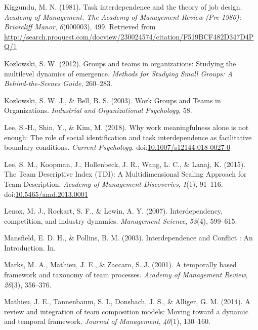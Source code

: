 \documentclass[english,,man]{apa6}
\theoremstyle{definition}
\theoremstyle{definition}
\theoremstyle{definition}
\theoremstyle{remark}
\begin{document}
\leavevmode\hypertarget{ref-kiggundu_task_1981}{}%
Kiggundu, M. N. (1981). Task interdependence and the theory of job
design. \emph{Academy of Management. The Academy of Management Review
(Pre-1986); Briarcliff Manor}, \emph{6}(000003), 499. Retrieved from
\url{http://search.proquest.com/docview/230024574/citation/F519BCF482D347D4PQ/1}

\leavevmode\hypertarget{ref-kozlowski_groups_2012}{}%
Kozlowski, S. W. (2012). Groups and teams in organizations: Studying the
multilevel dynamics of emergence. \emph{Methods for Studying Small
Groups: A Behind-the-Scenes Guide}, 260--283.

\leavevmode\hypertarget{ref-kozlowski_work_nodate}{}%
Kozlowski, S. W. J., \& Bell, B. S. (2003). Work Groups and Teams in
Organizations. \emph{Industrial and Organizational Psychology}, 58.

\leavevmode\hypertarget{ref-lee_why_2018}{}%
Lee, S.-H., Shin, Y., \& Kim, M. (2018). Why work meaningfulness alone
is not enough: The role of social identification and task
interdependence as facilitative boundary conditions. \emph{Current
Psychology}.
doi:\href{https://doi.org/10.1007/s12144-018-0027-0}{10.1007/s12144-018-0027-0}

\leavevmode\hypertarget{ref-lee_team_2015}{}%
Lee, S. M., Koopman, J., Hollenbeck, J. R., Wang, L. C., \& Lanaj, K.
(2015). The Team Descriptive Index (TDI): A Multidimensional Scaling
Approach for Team Description. \emph{Academy of Management Discoveries},
\emph{1}(1), 91--116.
doi:\href{https://doi.org/10.5465/amd.2013.0001}{10.5465/amd.2013.0001}

\leavevmode\hypertarget{ref-lenox_interdependency_2007}{}%
Lenox, M. J., Rockart, S. F., \& Lewin, A. Y. (2007). Interdependency,
competition, and industry dynamics. \emph{Management Science},
\emph{53}(4), 599--615.

\leavevmode\hypertarget{ref-mansfield_interdependence_2003}{}%
Mansfield, E. D. H., \& Pollins, B. M. (2003). Interdependence and
Conflict : An Introduction. In.

\leavevmode\hypertarget{ref-marks_temporally_2001}{}%
Marks, M. A., Mathieu, J. E., \& Zaccaro, S. J. (2001). A temporally
based framework and taxonomy of team processes. \emph{Academy of
Management Review}, \emph{26}(3), 356--376.

\leavevmode\hypertarget{ref-mathieu_review_2014}{}%
Mathieu, J. E., Tannenbaum, S. I., Donsbach, J. S., \& Alliger, G. M.
(2014). A review and integration of team composition models: Moving
toward a dynamic and temporal framework. \emph{Journal of Management},
\emph{40}(1), 130--160.
\end{document}
